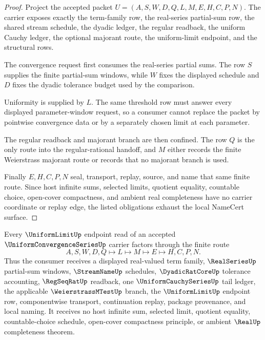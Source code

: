 \begin{proof}
Project the accepted packet $U=(A,S,W,D,Q,L,M,E,H,C,P,N)$. The carrier exposes exactly the term-family row, the real-series partial-sum row, the shared stream schedule, the dyadic ledger, the regular readback, the uniform Cauchy ledger, the optional majorant route, the uniform-limit endpoint, and the structural rows.

The convergence request first consumes the real-series partial sums. The row $S$ supplies the finite partial-sum windows, while $W$ fixes the displayed schedule and $D$ fixes the dyadic tolerance budget used by the comparison.

Uniformity is supplied by $L$. The same threshold row must answer every displayed parameter-window request, so a consumer cannot replace the packet by pointwise convergence data or by a separately chosen limit at each parameter.

The regular readback and majorant branch are then confined. The row $Q$ is the only route into the regular-rational handoff, and $M$ either records the finite Weierstrass majorant route or records that no majorant branch is used.

Finally $E,H,C,P,N$ seal, transport, replay, source, and name that same finite route. Since host infinite sums, selected limits, quotient equality, countable choice, open-cover compactness, and ambient real completeness have no carrier coordinate or replay edge, the listed obligations exhaust the local NameCert surface.
\end{proof}

\begin{theorem}
\label{thm:uniform-convergence-series-realseries-handoff}
Every $\UniformLimitUp$ endpoint read of an accepted $\UniformConvergenceSeriesUp$ carrier factors through the finite route
$$
A,S,W,D,Q \longmapsto L \longmapsto M \longmapsto E \longmapsto H,C,P,N .
$$
Thus the consumer receives a displayed real-valued term family, $\RealSeriesUp$ partial-sum windows, $\StreamNameUp$ schedules, $\DyadicRatCoreUp$ tolerance accounting, $\RegSeqRatUp$ readback, one $\UniformCauchySeriesUp$ tail ledger, the applicable $\WeierstrassMTestUp$ branch, the $\UniformLimitUp$ endpoint row, componentwise transport, continuation replay, package provenance, and local naming. It receives no host infinite sum, selected limit, quotient equality, countable-choice schedule, open-cover compactness principle, or ambient $\RealUp$ completeness theorem.
\end{theorem}

